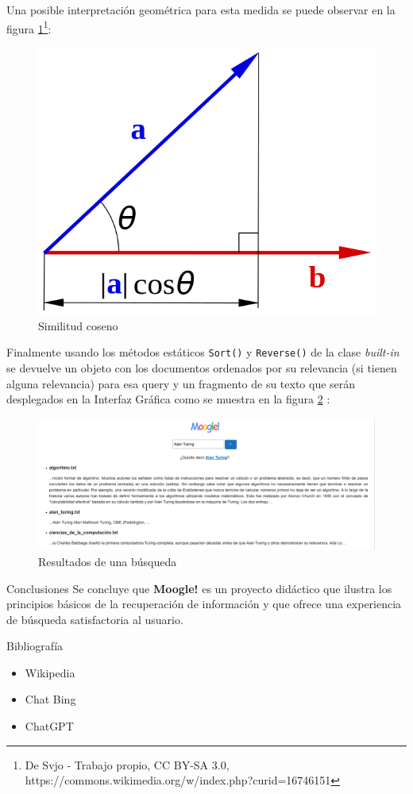 \documentclass{beamer}
\begin{document}
\begin{frame}
Una posible interpretación geométrica para esta medida se puede observar en la figura \ref{fig:similitudcoseno}\footnote{De Svjo - Trabajo propio, CC BY-SA 3.0, https://commons.wikimedia.org/w/index.php?curid=16746151}:
\begin{figure}
    \centering
    \includegraphics[width=0.5\linewidth]{605px-Scalar-product-dot-product.svg.png}
    \caption{Similitud coseno}
    \label{fig:similitudcoseno}
\end{figure}

\end{frame}
\begin{frame}
  Finalmente usando los métodos estáticos \texttt{Sort()} y \texttt{Reverse()} de la clase \textit{built-in}   se devuelve un objeto  con los documentos ordenados por su relevancia (si tienen alguna relevancia) para esa query y un fragmento de su texto que serán desplegados en la Interfaz Gráfica como se muestra en la figura \ref{fig:resultados} : 
  \begin{figure}
      \centering
      \includegraphics[width=1.\linewidth]{result.png}
      \caption{Resultados de una búsqueda}
      \label{fig:resultados}
  \end{figure}
\end{frame} 
\begin{frame}{Conclusiones}
Se concluye que \textbf{Moogle!} es un proyecto didáctico que ilustra los principios básicos de la recuperación de información y que ofrece una experiencia de búsqueda satisfactoria al usuario.
\end{frame}
\begin{frame}{Bibliografía }
\begin{itemize}
    \item Wikipedia 
    \item Chat Bing
    \item ChatGPT
\end{itemize}
\end{frame}
\end{document}
